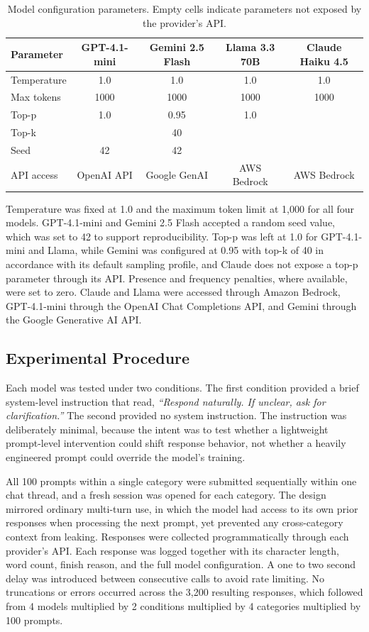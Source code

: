 \documentclass[10pt]{article}
\begin{document}
\begin{table}[ht]
\centering
\caption{Model configuration parameters. Empty cells indicate parameters not exposed by the provider's API.}
\label{tab:config}
\small
\begin{tabular}{lcccc}
\toprule
\textbf{Parameter} & \textbf{GPT-4.1-mini} & \textbf{Gemini 2.5 Flash} & \textbf{Llama 3.3 70B} & \textbf{Claude Haiku 4.5} \\
\midrule
Temperature & 1.0 & 1.0 & 1.0 & 1.0 \\
Max tokens & 1000 & 1000 & 1000 & 1000 \\
Top-p & 1.0 & 0.95 & 1.0 & \\
Top-k & & 40 & & \\
Seed & 42 & 42 & & \\
API access & OpenAI API & Google GenAI & AWS Bedrock & AWS Bedrock \\
\bottomrule
\end{tabular}
\end{table}

Temperature was fixed at 1.0 and the maximum token limit at 1{,}000 for all four models. GPT-4.1-mini and Gemini 2.5 Flash accepted a random seed value, which was set to 42 to support reproducibility. Top-p was left at 1.0 for GPT-4.1-mini and Llama, while Gemini was configured at 0.95 with top-k of 40 in accordance with its default sampling profile, and Claude does not expose a top-p parameter through its API. Presence and frequency penalties, where available, were set to zero. Claude and Llama were accessed through Amazon Bedrock, GPT-4.1-mini through the OpenAI Chat Completions API, and Gemini through the Google Generative AI API.

\subsection{Experimental Procedure}

Each model was tested under two conditions. The first condition provided a brief system-level instruction that read, \emph{``Respond naturally. If unclear, ask for clarification.''} The second provided no system instruction. The instruction was deliberately minimal, because the intent was to test whether a lightweight prompt-level intervention could shift response behavior, not whether a heavily engineered prompt could override the model's training.

All 100 prompts within a single category were submitted sequentially within one chat thread, and a fresh session was opened for each category. The design mirrored ordinary multi-turn use, in which the model had access to its own prior responses when processing the next prompt, yet prevented any cross-category context from leaking. Responses were collected programmatically through each provider's API. Each response was logged together with its character length, word count, finish reason, and the full model configuration. A one to two second delay was introduced between consecutive calls to avoid rate limiting. No truncations or errors occurred across the 3{,}200 resulting responses, which followed from 4 models multiplied by 2 conditions multiplied by 4 categories multiplied by 100 prompts.
\end{document}
